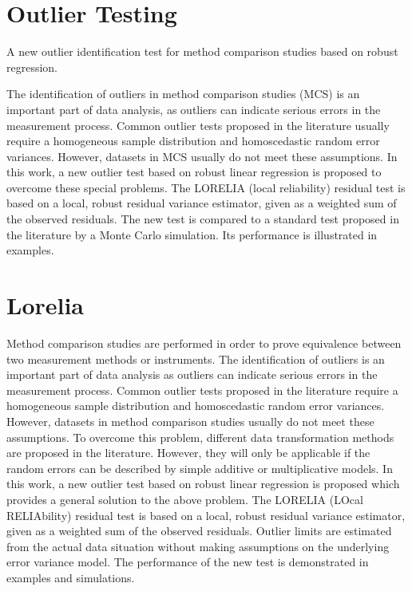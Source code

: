 \documentclass[12pt, a4paper]{report}
\theoremstyle{plain}
\theoremstyle{definition}
\theoremstyle{remark}
\begin{document}
\section{Outlier Testing} 
A new outlier identification test for method comparison studies based on robust regression.

The identification of outliers in method comparison studies (MCS) is an important part of data analysis, as outliers can indicate serious errors in the measurement process. Common outlier tests proposed in the literature usually require a homogeneous sample distribution and homoscedastic random error variances. However, datasets in MCS usually do not meet these assumptions. In this work, a new outlier test based on robust linear regression is proposed to overcome these special problems. The LORELIA (local reliability) residual test is based on a local, robust residual variance estimator, given as a weighted sum of the observed residuals. The new test is compared to a standard test proposed in the literature by a Monte Carlo simulation. Its performance is illustrated in examples.

\section{Lorelia}


Method comparison studies are performed in order to prove equivalence between two measurement methods or instruments. The identification of outliers is an important part of data analysis as outliers can indicate serious errors in the measurement process. Common outlier tests 
proposed in the literature require a homogeneous sample distribution and homoscedastic random error variances. However, datasets in method comparison studies usually do not meet these assumptions. To overcome this problem, different data transformation methods are proposed in the literature. However, they will only be applicable if the random errors can be described by simple additive or multiplicative models. In this work, a new outlier test based on robust linear regression is proposed which provides a general solution to the above problem. The LORELIA (LOcal RELIAbility) residual test is based on a local, robust residual variance estimator, given as a weighted sum of the observed residuals. Outlier limits are estimated from the actual data situation without making assumptions on the underlying error variance model. The performance of the new test is demonstrated in examples and simulations.
\end{document}
